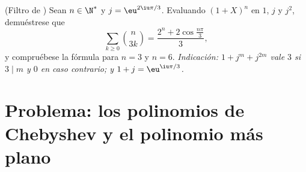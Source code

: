\begin{exercise}[$\star\star$]\label{exo:b1:poly:12}
(Filtro de ) Sean $n \in \N^*$ y
$j = \eu^{2\iu\pi/3}$. Evaluando $(1 + X)^n$ en $1$, $j$ y $j^2$,
demuéstrese que
\[
\sum_{k \geq 0} \binom{n}{3k}
= \frac{2^n + 2\cos\frac{n\pi}{3}}{3} ,
\]
y compruébese la fórmula para $n = 3$ y $n = 6$. \emph{Indicación:
$1 + j^m + j^{2m}$ vale $3$ si $3 \mid m$ y $0$ en caso contrario; y
$1 + j = \eu^{\iu\pi/3}$.}
\end{exercise}

\section{Problema: los polinomios de Chebyshev y el polinomio más plano}

